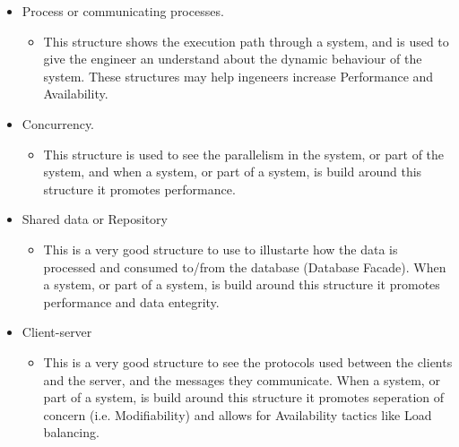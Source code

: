 \begin{itemize}
  \item Process or communicating processes.
	\begin{itemize}
	  \item This structure shows the execution path through a system, and is used to give the engineer an understand about the dynamic behaviour of the system. These structures may help ingeneers increase Performance and Availability.
	\end{itemize}
  \item Concurrency.
	\begin{itemize}
	  \item This structure is used to see the parallelism in the system, or part of the system, and when a system, or part of a system, is build around this structure it promotes performance. 
	\end{itemize}
  \item Shared data or Repository
	\begin{itemize}
	  \item This is a very good structure to use to illustarte how the data is processed and consumed to/from the database (Database Facade). When a system, or part of a system, is build around this structure it promotes performance and data entegrity. 
	\end{itemize}
  \item Client-server
	\begin{itemize}
  		\item This is a very good structure to see the protocols used between the clients and the server, and the messages they communicate. When a system, or part of a system, is build around this structure it promotes seperation of concern (i.e. Modifiability) and allows for Availability tactics like Load balancing.
	\end{itemize}
\end{itemize}

